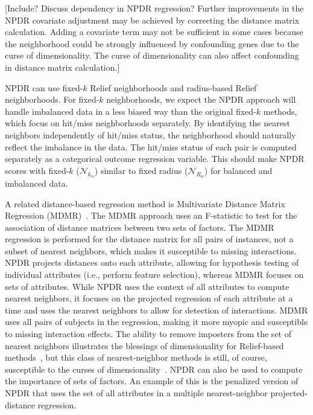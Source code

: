 \documentclass[10pt]{article}
\begin{document}
[Include? Discuss dependency in NPDR regression? Further improvements in the NPDR covariate adjustment may be achieved by correcting the distance matrix calculation. Adding a covariate term may not be sufficient in some cases because the neighborhood could be strongly influenced by confounding genes due to the curse of dimensionality. The curse of dimensionality can also affect confounding in distance matrix calculation.]

NPDR can use fixed-$k$ Relief neighborhoods and radius-based Relief neighborhoods. For fixed-$k$ neighborhoods, we expect the NPDR approach will handle imbalanced data in a less biased way than the original fixed-$k$ methods, which focus on hit/miss neighborhoods separately. By identifying the nearest neighbors independently of hit/miss status, the neighborhood should naturally reflect the imbalance in the data. The hit/miss status of each pair is computed separately as a categorical outcome regression variable. This should make NPDR scores with fixed-$k$ ($\mathcal{N}_{k_\alpha}$) similar to fixed radius ($\mathcal{N}_{R_\alpha}$) for balanced and imbalanced data.    


A related distance-based regression method is Multivariate Distance Matrix Regression (MDMR)~\cite{schork12}. The MDMR approach uses an F-statistic to test for the association of distance matrices between two sets of factors. The MDMR regression is performed for the distance matrix for all pairs of instances, not a subset of nearest neighbors, which makes it susceptible to missing interactions. NPDR projects distances onto each attribute, allowing for hypothesis testing of individual attributes (i.e., perform feature selection), whereas MDMR focuses on sets of attributes. While NPDR uses the context of all attributes to compute nearest neighbors, it focuses on the projected regression of each attribute at a time and uses the nearest neighbors to allow for detection of interactions. MDMR uses all pairs of subjects in the regression, making it more myopic and susceptible to missing interaction effects. The ability to remove imposters from the set of nearest neighbors illustrates the blessings of dimensionality for Relief-based methods~\cite{bod}, but this class of nearest-neighbor methods is still, of course, susceptible to the curses of dimensionality~\cite{CoD}. NPDR can also be used to compute the importance of sets of factors. An example of this is the penalized version of NPDR that uses the set of all attributes in a multiple nearest-neighbor projected-distance regression.
\end{document}
